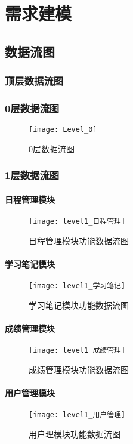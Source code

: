 \chapter{需求建模}
\section{数据流图}
\subsection{顶层数据流图}
\subsection{0层数据流图}
\begin{figure}[H]
\centering
\texttt{[image: Level\_0]}
\caption{0层数据流图}
\end{figure}
\subsection{1层数据流图}
\subsubsection{日程管理模块}
\begin{figure}[H]
\centering
\texttt{[image: level1\_日程管理]}
\caption{日程管理模块功能数据流图}
\end{figure}
\subsubsection{学习笔记模块}
\begin{figure}[H]
\centering
\texttt{[image: level1\_学习笔记]}
\caption{学习笔记模块功能数据流图}
\end{figure}
\subsubsection{成绩管理模块}
\begin{figure}[H]
\centering
\texttt{[image: level1\_成绩管理]}
\caption{成绩管理模块功能数据流图}
\end{figure}
\subsubsection{用户管理模块}
\begin{figure}[H]
\centering
\texttt{[image: level1\_用户管理]}
\caption{用户理模块功能数据流图}
\end{figure}
